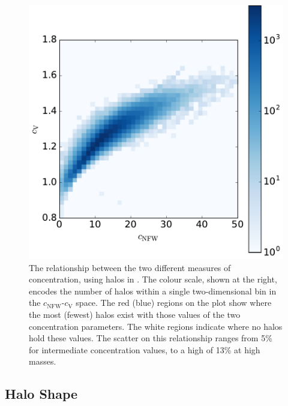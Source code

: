 \documentclass[usenatbib,fleqn]{mnras}
\begin{document}
\begin{figure}
\centering
\includegraphics[width=\columnwidth]{cvvscnfw_relation.pdf}
\caption{
The relationship between the two different measures of concentration, 
using halos in \simB. The colour scale, shown at the right, encodes the number of halos 
within a single two-dimensional bin in the $c_{\mathrm{NFW}}$-$c_{\mathrm{V}}$ space. 
The red (blue) regions on the plot show where the most (fewest) halos exist with those values of the two concentration parameters. The white regions indicate where no halos hold these values. The scatter on this relationship ranges from 5\% for intermediate concentration values, to a high of 13\% at high masses.
}
\label{fig:concentrations}
\end{figure}


\subsection{Halo Shape}
\end{document}

